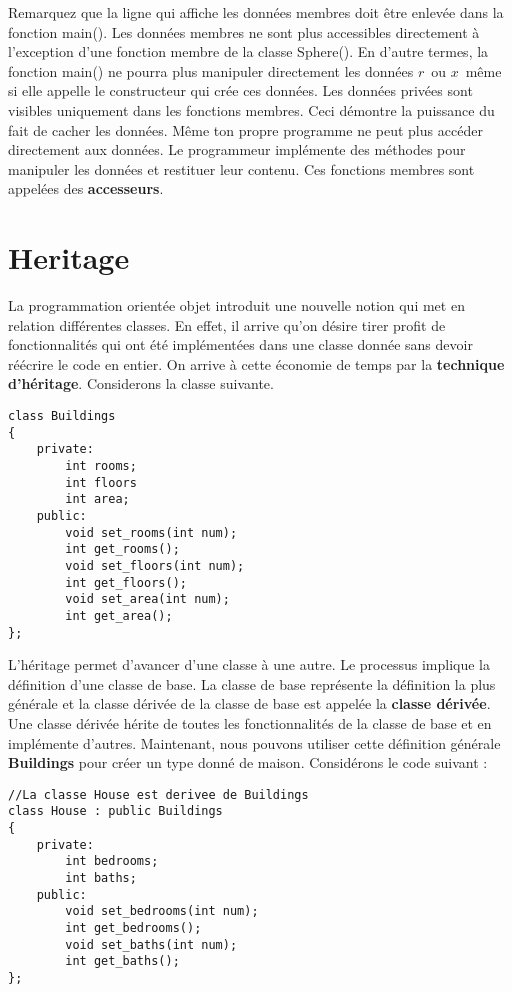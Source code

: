 \documentclass[a4paper, oneside,11pt]{book}
\begin{document}
Remarquez que la ligne qui affiche les donn\'ees membres doit \^etre enlev\'ee dans la fonction main(). Les donn\'ees membres ne sont plus accessibles directement
\`a l'exception d'une fonction membre de la classe Sphere(). En d'autre termes, la fonction main() ne pourra plus manipuler directement les donn\'ees $r$\ ou $x$\ m\^eme si elle appelle
le constructeur qui cr\'ee ces donn\'ees. Les donn\'ees priv\'ees sont visibles uniquement dans les fonctions membres. Ceci d\'emontre la puissance du fait de cacher les donn\'ees.
M\^eme ton propre programme ne peut plus acc\'eder directement aux donn\'ees. Le programmeur impl\'emente des m\'ethodes pour manipuler les donn\'ees et restituer leur contenu. Ces fonctions membres sont appel\'ees des \textbf{accesseurs}.


\section{Heritage}
La programmation orient\'ee objet introduit une nouvelle notion qui met en relation diff\'erentes classes. En effet, il arrive qu'on d\'esire tirer profit de fonctionnalit\'es
qui ont \'et\'e impl\'ement\'ees dans  une classe donn\'ee sans devoir r\'e\'ecrire le code en entier. On arrive \`a cette \'economie de temps par la \textbf{technique d'h\'eritage}.
Considerons la classe suivante.

\begin{lstlisting}
class Buildings
{
    private:
        int rooms;
        int floors
        int area;
    public:
        void set_rooms(int num);
        int get_rooms();
        void set_floors(int num);
        int get_floors();
        void set_area(int num);
        int get_area();
};
\end{lstlisting}

L'h\'eritage permet d'avancer d'une classe \`a une autre. Le processus implique la d\'efinition d'une classe de  base. La classe de base repr\'esente la d\'efinition 
la plus g\'en\'erale et la classe d\'eriv\'ee de la classe de base
est appel\'ee la \textbf{classe d\'eriv\'ee}. Une classe d\'eriv\'ee h\'erite de toutes les fonctionnalit\'es de la
classe de base et en impl\'emente d'autres. Maintenant, nous pouvons utiliser cette d\'efinition g\'en\'erale
\textbf{Buildings} pour 
cr\'eer un type donn\'e de maison. Consid\'erons le code suivant :

\begin{lstlisting}
//La classe House est derivee de Buildings
class House : public Buildings
{
    private:
        int bedrooms;
        int baths;
    public:
        void set_bedrooms(int num);
        int get_bedrooms();
        void set_baths(int num);
        int get_baths();
};
\end{lstlisting}
\end{document}

